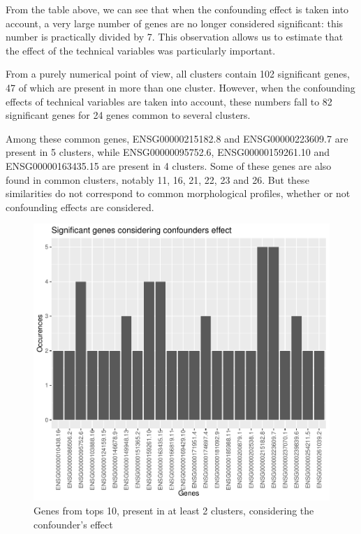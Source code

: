 \documentclass[a4paper, 11pt]{article}
\begin{document}
\begin{multicols}{2}
From the table above, we can see that when the confounding effect is taken into account, a very large number of genes are no longer considered significant: this number is practically divided by 7. This observation allows us to estimate that the effect of the technical variables was particularly important.

From a purely numerical point of view, all clusters contain 102 significant genes, 47 of which are present in more than one cluster. However, when the confounding effects of technical variables are taken into account, these numbers fall to 82 significant genes for 24 genes common to several clusters. 

Among these common genes, ENSG00000215182.8 and ENSG00000223609.7 are present in 5 clusters, while ENSG00000095752.6, ENSG00000159261.10 and ENSG00000163435.15 are present in 4 clusters. Some of these genes are also found in common clusters, notably 11, 16, 21, 22, 23 and 26. But these similarities do not correspond to common morphological profiles, whether or not confounding effects are considered. 

\begin{figure}[H]
	\centering
	\includegraphics[width=\columnwidth]{figures/final_analysis/SigGenesConsideringConf}
	\caption{Genes from tops 10, present in at least 2 clusters, considering the confounder's effect}
	\label{fig:genesOcc}
\end{figure}


\end{multicols}
\end{document}
